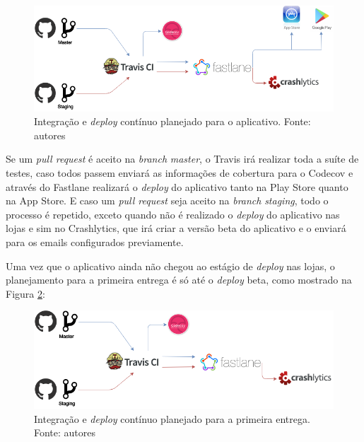 \begin{figure}[H]
    \centering
    \includegraphics[scale=0.5]{figuras/ci_should_be.png}
    \caption[Integração e \textit{deploy} contínuo planejado para o aplicativo]{Integração e \textit{deploy} contínuo planejado para o aplicativo. Fonte: autores}
    \label{img:integracao_deploy_continuo_planejado_app}
\end{figure}

Se um \textit{pull request} é aceito na \textit{branch} \textit{master}, o Travis irá realizar toda a suíte de testes, caso todos passem enviará as informações de cobertura para o
Codecov e através do Fastlane realizará o \textit{deploy} do aplicativo tanto na Play Store quanto na App Store. E caso um \textit{pull request} seja aceito na \textit{branch} \textit{staging}, todo o processo é repetido, exceto quando não é realizado o \textit{deploy} do aplicativo nas lojas e sim no Crashlytics, que irá criar a versão beta do aplicativo e o enviará para os emails configurados previamente.

Uma vez que o aplicativo ainda não chegou ao estágio de \textit{deploy} nas lojas, o planejamento para a primeira entrega é só até o \textit{deploy} beta, como mostrado na Figura \ref{img:integracao_deploy_continuo_planejado_primeira_entrega}:

\begin{figure}[H]
    \centering
    \includegraphics[scale=0.5]{figuras/ci_as_is.png}
    \caption[Integração e \textit{deploy} contínuo planejado para a primeira entrega]{Integração e \textit{deploy} contínuo planejado para a primeira entrega. Fonte: autores}
    \label{img:integracao_deploy_continuo_planejado_primeira_entrega}
\end{figure}

